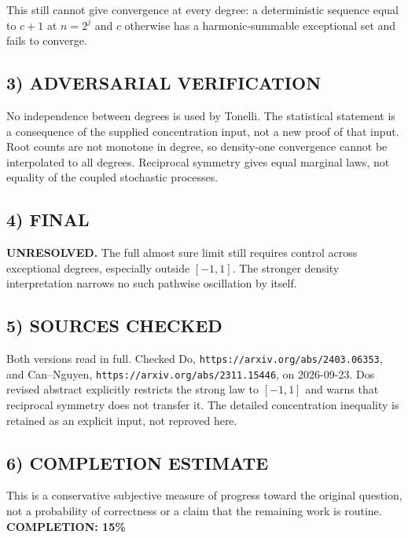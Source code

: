 This still cannot give convergence at every degree: a deterministic sequence equal to $c+1$ at $n=2^j$ and $c$ otherwise has a harmonic-summable exceptional set and fails to converge.
\subsection{3) ADVERSARIAL VERIFICATION}
No independence between degrees is used by Tonelli. The statistical statement is a consequence of the supplied concentration input, not a new proof of that input. Root counts are not monotone in degree, so density-one convergence cannot be interpolated to all degrees. Reciprocal symmetry gives equal marginal laws, not equality of the coupled stochastic processes.
\subsection{4) FINAL}
\textbf{UNRESOLVED.}
The full almost sure limit still requires control across exceptional degrees, especially outside $[-1,1]$. The stronger density interpretation narrows no such pathwise oscillation by itself.
\subsection{5) SOURCES CHECKED}
Both versions read in full. Checked Do, \texttt{https://arxiv.org/abs/2403.06353}, and Can--Nguyen, \texttt{https://arxiv.org/abs/2311.15446}, on 2026-09-23. Do\textquotesingle s revised abstract explicitly restricts the strong law to $[-1,1]$ and warns that reciprocal symmetry does not transfer it. The detailed concentration inequality is retained as an explicit input, not reproved here.
\subsection{6) COMPLETION ESTIMATE}
This is a conservative subjective measure of progress toward the original question, not a probability of correctness or a claim that the remaining work is routine.
\textbf{COMPLETION: 15\%}
